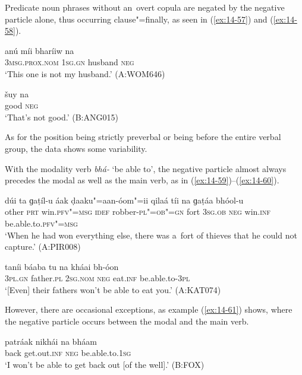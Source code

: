 Predicate noun phrases without an~overt copula are negated by the negative particle alone, thus occurring clause"=finally, as seen in (\ref{ex:14-57}) and (\ref{ex:14-58}).

\begin{exe}
\ex
\label{ex:14-57}
\gll anú míi bharíiw na \\
\textsc{3msg.prox.nom} \textsc{1sg.gn} husband \textsc{neg} \\
\glt `This one is not my husband.' (A:WOM646)

\ex
\label{ex:14-58}
\gll šuy na \\
good \textsc{neg} \\
\glt `That's not good.' (B:ANG015)
\end{exe}

As for the position being strictly preverbal or being before the entire verbal group, the data shows some variability. 


With the modality verb \textit{bhá-} `be able to', the negative particle almost always precedes the modal as well as the main verb, as in (\ref{ex:14-59})--(\ref{ex:14-60}).

\begin{exe}
\ex
\label{ex:14-59}
\gll dúi ta ɡaṭíl-u áak ḍaaku"=aan-óom"=ii qilaá  tíi na ɡaṭáa bhóol-u \\
other \textsc{prt} win.\textsc{pfv"=msg} \textsc{idef} robber-\textsc{pl"=ob"=gn} fort  \textsc{3sg.ob} \textsc{neg} win.\textsc{inf} be.able.to.\textsc{pfv"=msg}  \\
\glt `When he had won everything else, there was a~fort of thieves that he could not capture.' (A:PIR008)

\ex
\label{ex:14-60}
\gll taníi báaba tu na kháai bh-óon \\
\textsc{3pl.gn} father.\textsc{pl} \textsc{2sg.nom} \textsc{neg} eat.\textsc{inf} be.able.to-\textsc{3pl} \\
\glt `[Even] their fathers won't be able to eat you.' (A:KAT074)
\end{exe}

However, there are occasional exceptions, as example (\ref{ex:14-61}) shows, where the negative particle occurs between the modal and the main verb.

\begin{exe}
\ex
\label{ex:14-61}
\gll patráak nikhái na bháam \\
back get.out.\textsc{inf} \textsc{neg} be.able.to.\textsc{1sg} \\
\glt `I won't be able to get back out [of the well].' (B:FOX)
\end{exe}

